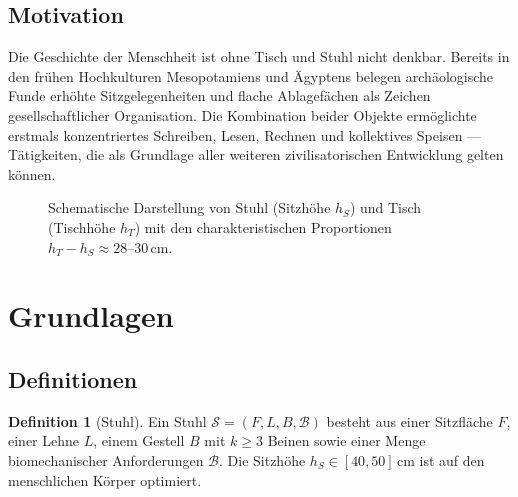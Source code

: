 \documentclass[a4paper,12pt]{article}
\theoremstyle{definition}
\newtheorem{definition}{Definition}
\begin{document}
\subsection{Motivation}

Die Geschichte der Menschheit ist ohne Tisch und Stuhl nicht denkbar. Bereits in den
fr\"{u}hen Hochkulturen Mesopotamiens und \"{A}gyptens belegen arch\"{a}ologische Funde erh\"{o}hte
Sitzgelegenheiten und flache Ablagef\"{a}chen als Zeichen gesellschaftlicher Organisation.
Die Kombination beider Objekte erm\"{o}glichte erstmals konzentriertes Schreiben, Lesen,
Rechnen und kollektives Speisen --- T\"{a}tigkeiten, die als Grundlage aller weiteren
zivilisatorischen Entwicklung gelten k\"{o}nnen.

\begin{figure}[h]
\centering
{}
\caption{Schematische Darstellung von Stuhl (Sitzh\"{o}he $h_S$) und Tisch (Tischh\"{o}he $h_T$)
mit den charakteristischen Proportionen $h_T - h_S \approx 28\text{--}30\,\mathrm{cm}$.}
\label{fig:tischstuhl}
\end{figure}

\section{Grundlagen}

\subsection{Definitionen}

\begin{definition}[Stuhl]
	Ein Stuhl $\mathcal{S} = (F, L, B, \mathcal{B})$ besteht aus einer Sitzfl\"{a}che $F$,
	einer Lehne $L$, einem Gestell $B$ mit $k \geq 3$ Beinen sowie einer Menge
	biomechanischer Anforderungen $\mathcal{B}$. Die Sitzh\"{o}he $h_S \in [40, 50]\,\mathrm{cm}$
	ist auf den menschlichen K\"{o}rper optimiert.
\end{definition}
\end{document}
